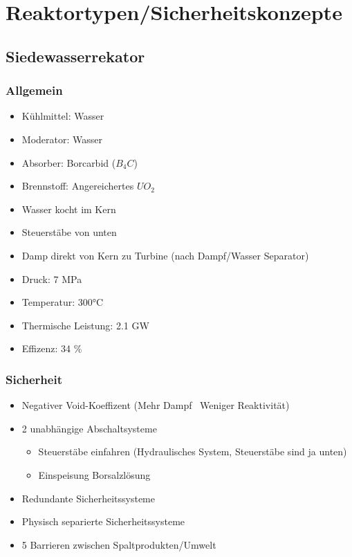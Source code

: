 \documentclass[12pt]{article}
\begin{document}
\thispagestyle{empty}

\section{Reaktortypen/Sicherheitskonzepte}

\subsection{Siedewasserrekator}

\subsubsection{Allgemein}
\begin{itemize}
  \item Kühlmittel: Wasser
  \item Moderator: Wasser
  \item Absorber: Borcarbid (\(B_4C\))
  \item Brennstoff: Angereichertes \(UO_2\)
  \item Wasser kocht im Kern
  \item Steuerstäbe von unten
  \item Damp direkt von Kern zu Turbine (nach Dampf/Wasser Separator)
  \item Druck: 7 MPa
  \item Temperatur: 300°C
  \item Thermische Leistung: 2.1 GW
  \item Effizenz: 34 \%
\end{itemize}

\subsubsection{Sicherheit}
\begin{itemize}
  \item Negativer Void-Koeffizent (Mehr Dampf \textrightarrow\ Weniger Reaktivität)
  \item 2 unabhängige Abschaltsysteme
  \begin{itemize}
    \item Steuerstäbe einfahren (Hydraulisches System, Steuerstäbe sind ja unten)
    \item Einspeisung Borsalzlösung
  \end{itemize}
  \item Redundante Sicherheitssysteme
  \item Physisch separierte Sicherheitssysteme
  \item 5 Barrieren zwischen Spaltprodukten/Umwelt
\end{itemize}
\end{document}
